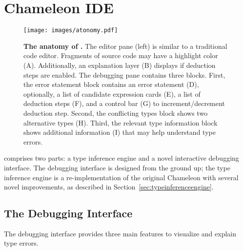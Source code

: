 \section{Chameleon IDE} \label{chameleon}
\begin{figure}[ht]
    \centering
    \texttt{[image: images/atonomy.pdf]}
    \caption[The anatomy of \chameleon{}]{
        \textbf{The anatomy of \chameleon{}.}
        The editor pane (left) is similar to a traditional code editor. Fragments of source code may have a highlight
        color (A). Additionally, an explanation layer (B) displays if deduction steps are enabled. The debugging pane contains three blocks. First, the error statement block contains an error statement (D), optionally, a list of candidate expression cards (E), a list of deduction steps (F), and a control bar (G) to increment/decrement deduction step. Second, the conflicting types block shows two alternative types (H). Third, the relevant type information block shows additional information (I) that may help understand type errors.
    }
    \label{fig:anatomy}
\end{figure}


\chameleon{} comprises two parts: a type inference engine and a novel interactive debugging interface. 
The debugging interface is designed from the ground up; the type inference engine is a re-implementation of the original Chameleon with several novel improvements, as described in Section~\ref{sec:typeinferenceengine}.




\subsection{The Debugging Interface}

The \chameleon{} debugging interface provides three main features to visualize and explain type errors.

